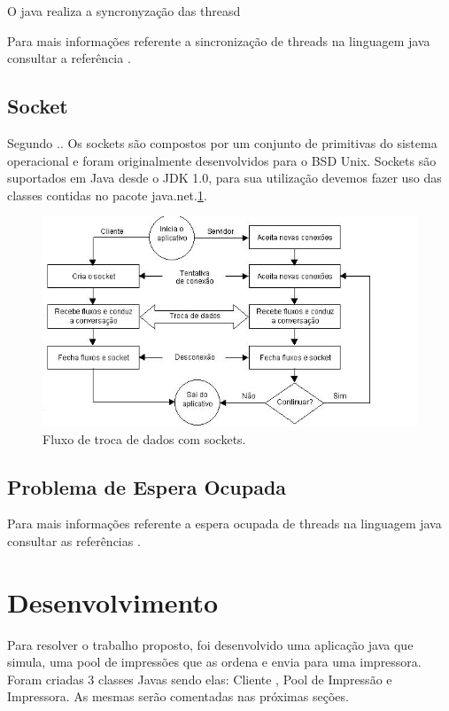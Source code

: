 \documentclass[12pt]{article}
\begin{document}
	O java realiza a syncronyzação das threasd
	
	Para mais informações referente a sincronização de threads na linguagem java consultar a referência \cite{ct}.

 
\subsection{Socket}

 Segundo \cite{socket}.\cite{conc}.
 Os sockets são compostos por um conjunto de primitivas do sistema operacional e foram originalmente desenvolvidos para o BSD Unix. Sockets são suportados em Java desde o JDK 1.0, para sua utilização devemos fazer uso das classes contidas no pacote java.net.\ref{fluxoSocket}.
\begin{figure}[H]
	\centering
	\includegraphics[scale=1]{imagens/fluxoSocket.JPG}
    \caption{Fluxo de troca de dados com sockets.}
	\label{fluxoSocket}
\end{figure}

 \subsection{Problema de Espera Ocupada} \label{Espera}
 	
 Para mais informações referente a espera ocupada de threads na linguagem java consultar as referências \cite{conc} \cite{wait}.
\section{Desenvolvimento}
Para resolver o trabalho proposto, foi desenvolvido uma aplicação java que simula, uma pool de impressões que as ordena e envia para uma impressora.
Foram criadas 3 classes Javas sendo elas: Cliente , Pool de Impressão e Impressora.
As mesmas serão comentadas nas próximas seções.
\end{document}
